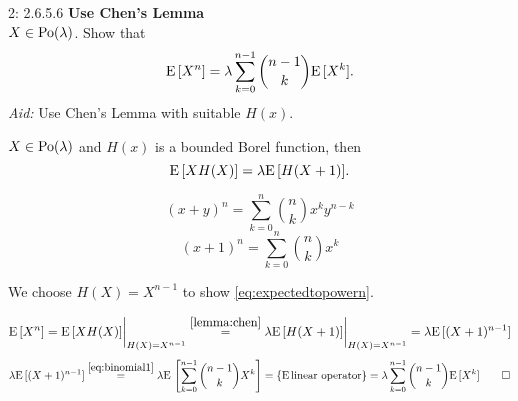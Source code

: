 \documentclass[a4paper,twoside=false,abstract=false,numbers=noenddot,
titlepage=false,headings=small,parskip=half,version=last]{scrartcl}
\begin{document}
\begin{exercise}{2: 2.6.5.6} \textbf{Use Chen's Lemma} \\
    $X \in \text{Po}(\lambda)$. Show that
    \begin{equation}
        \label{eq:expectedtopowern}
        {\rm E}\,[X^n] =
        \lambda \sum\limits_{k=0}^{n-1} \binom{n-1}{k}{\rm E}\,[X^k].
    \end{equation}
    \textit{Aid:} Use Chen's Lemma with suitable $H(x)$.
\end{exercise}
\begin{solution}
    \begin{lemma}
        \label{lemma:chen}  %
        $X \in \text{Po}(\lambda)$ and $H(x)$ is a bounded
        Borel function, then
        \begin{equation}
            \label{eq:chen}
            {\rm E}\,[XH(X)] = \lambda{\rm E}\,[H(X+1)].
        \end{equation}
    \end{lemma}
    \begin{identity}
        \label{id:binomial}
        \begin{equation}
            \label{eq:binomial}
            (x+y)^n = \sum\limits_{k=0}^n \binom{n}{k} x^ky^{n-k}
        \end{equation}
        \begin{equation}
            \label{eq:binomial1}
            (x+1)^n = \sum\limits_{k=0}^n \binom{n}{k} x^k
        \end{equation}
    \end{identity}

    We choose $H(X) = X^{n-1}$ to show \eqref{eq:expectedtopowern}.

    \begin{equation}
        {\rm E}\,[X^n] = {{\rm E}\,[XH(X)]}\bigg|_{H(X)=X^{n-1}}
        \stackrel{\eqref{lemma:chen}}{=}
        \lambda {{\rm E}\,[H(X+1)]}\bigg|_{H(X)=X^{n-1}} =
        \lambda {\rm E}\,[(X+1)^{n-1}]
    \end{equation}
    \begin{equation}
        \lambda {\rm E}\,[(X+1)^{n-1}] \stackrel{\eqref{eq:binomial1}}{=}
        \lambda {\rm E}\,
            \left[
                \sum\limits_{k=0}^{n-1} \binom{n-1}{k}X^k
            \right] =
        \left\{{\rm E}\, \text{linear operator}\right\} =
        \lambda\sum\limits_{k=0}^{n-1} \binom{n-1}{k}{\rm E}\,[X^k] \qed
    \end{equation}
\end{solution}
\pagebreak
\end{document}
